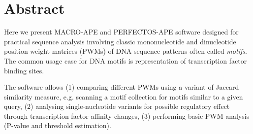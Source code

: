 \section{Abstract}
Here we present MACRO-APE and PERFECTOS-APE software designed for practical sequence analysis involving classic mononucleotide and dinucleotide position weight matrices (PWMs) of DNA sequence patterns often called \textit{motifs}. The common usage case for DNA motifs is representation of transcription factor binding sites.

The software allows (1) comparing different PWMs using a variant of Jaccard similarity measure, e.g. scanning a motif collection for motifs similar to a given query, (2) analysing single-nucleotide variants for possible regulatory effect through transcription factor affinity changes, (3) performing basic PWM analysis (P-value and threshold estimation).
